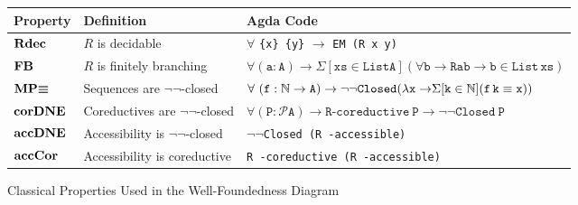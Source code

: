 
{
\def\arraystretch{1.3}
\begin{figure}[h!]
\small
\begin{tabular}{@{}l l l @{}}
\toprule
\textbf{Property} & \textbf{Definition}  &\textbf{Agda Code}  \\
\midrule
$\mathbf{Rdec}$   & $R$ is decidable
          & $\forall$ \verb|{x} {y}| $\to$ \verb|EM (R x y)|\\
$\mathbf{FB}$     & $R$ is finitely branching
          & $\mathtt{\forall (a : A) \to}\Sigma\mathtt{[ xs \in List A ] (\forall b \to R a b \to b \in{}List\, xs)}$ \\
$\mathbf{MP}{\boldsymbol{\equiv}}$    & Sequences are $\lnot\lnot$-closed
          & $\forall\ \mathtt{(f : \nat \to A) \to \lnot\lnot Closed
        (\lambda x \to} \Sigma \mathtt{[ k \in \nat ] (f\, k \equiv x))}$ \\
$\mathbf{corDNE}$ & Coreductives are $\lnot\lnot$-closed
          & $\mathtt{\forall (P : \mathcal{P} A) \to R}$-$\mathtt{coreductive\ P \to \lnot\lnot Closed\ P}$\\
$\mathbf{accDNE}$ & Accessibility is $\lnot\lnot$-closed
          & $\lnot\lnot$\verb|Closed (R -accessible)| \\
$\mathbf{accCor}$ & Accessibility is coreductive
          & \verb|R -coreductive (R -accessible)| \\

\bottomrule
\end{tabular}
\centering
\caption{Classical Properties Used in the Well-Foundedness Diagram}
\label{tab:cprop}
\end{figure}
}


